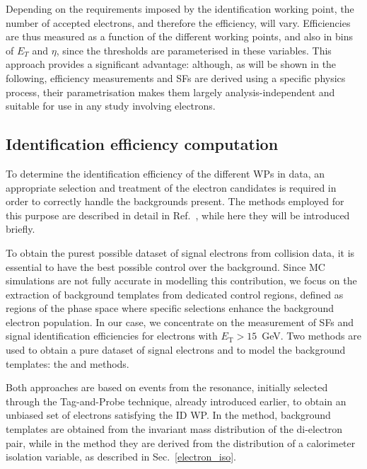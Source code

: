 Depending on the requirements imposed by the identification working point, the number of accepted electrons, and therefore the efficiency, will vary. Efficiencies are thus measured as a function of the different working points, and also in bins of $E_{T}$ and $\eta$, since the thresholds are parameterised in these variables. This approach provides a significant advantage: although, as will be shown in the following, efficiency measurements and SFs are derived using a specific physics process, their parametrisation makes them largely analysis-independent and suitable for use in any study involving electrons.

\subsection{Identification efficiency computation}
To determine the identification efficiency of the different WPs in data, an appropriate selection and treatment of the electron candidates is required in order to correctly handle the backgrounds present. The methods employed for this purpose are described in detail in Ref.~\cite{latest_electron_paper_2024}, while here they will be introduced briefly.

To obtain the purest possible dataset of signal electrons from collision data, it is essential to have the best possible control over the background. Since MC simulations are not fully accurate in modelling this contribution, we focus on the extraction of background templates from dedicated control regions, defined as regions of the phase space where specific selections enhance the background electron population. In our case, we concentrate on the measurement of SFs and signal identification efficiencies for electrons with $E_{\mathrm{T}} > 15$~GeV. Two methods are used to obtain a pure dataset of signal electrons and to model the background templates: the \zmass and \ziso methods.

Both approaches are based on events from the \zee resonance, initially selected through the Tag-and-Probe technique, already introduced earlier, to obtain an unbiased set of electrons satisfying the ID WP. In the \zmass method, background templates are obtained from the invariant mass distribution of the di-electron pair, while in the \ziso method they are derived from the distribution of a calorimeter isolation variable, as described in Sec.~\ref{electron_iso}.

